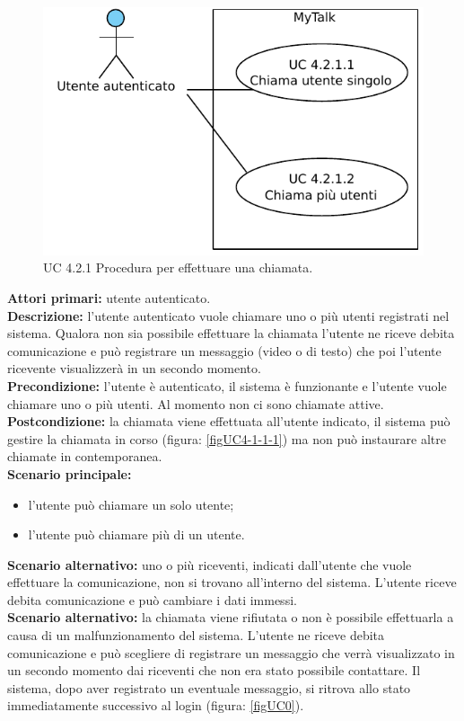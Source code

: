 \begin{figure}[htbp]
\centering
\includegraphics[scale=0.7]{./casi_uso/UC4-2-1.pdf}
\caption{UC 4.2.1 Procedura per effettuare una chiamata.}
\end{figure}

\noindent
\textbf{Attori primari:} utente autenticato.\\
\textbf{Descrizione:} l'utente autenticato vuole chiamare uno o più utenti registrati nel sistema. Qualora non sia possibile effettuare la chiamata l'utente ne riceve debita comunicazione e può registrare un messaggio (video o di testo) che poi l'utente ricevente visualizzerà in un secondo momento.\\
\textbf{Precondizione:} l'utente è autenticato, il sistema è funzionante e l'utente vuole chiamare uno o più utenti. Al momento non ci sono chiamate attive.\\
\textbf{Postcondizione:} la chiamata viene effettuata all'utente indicato, il sistema può gestire la chiamata in corso (figura: \ref{figUC4-1-1-1}) ma non può instaurare altre chiamate in contemporanea.\\
\textbf{Scenario principale:}
\begin{itemize}
\item l'utente può chiamare un solo utente;
\item l'utente può chiamare più di un utente.
\end{itemize}
\textbf{Scenario alternativo:} uno o più riceventi, indicati dall'utente che vuole effettuare la comunicazione, non si trovano all'interno del sistema. L'utente riceve debita comunicazione e può cambiare i dati immessi.\\
\textbf{Scenario alternativo:} la chiamata viene rifiutata o non è possibile effettuarla a causa di un malfunzionamento del sistema. L'utente ne riceve debita comunicazione e può scegliere di registrare un messaggio che verrà visualizzato in un secondo momento dai riceventi che non era stato possibile contattare. Il sistema, dopo aver registrato un eventuale messaggio, si ritrova allo stato immediatamente successivo al login (figura: \ref{figUC0}).

